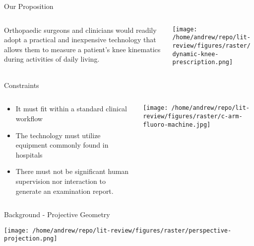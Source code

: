 \documentclass[presentation, aspectratio=1610]{beamer}
\begin{document}
\begin{frame}[label={sec:org0539fae}]{Our Proposition}
\begin{columns}
\begin{column}{0.5\columnwidth}
Orthopaedic surgeons and clinicians would readily adopt a \alert{\alert{practical}} and \alert{\alert{inexpensive}} technology that allows them to \alert{\alert{measure}} a patient's knee kinematics during \alert{\alert{activities of daily living}}.
\end{column}
\begin{column}{0.55\columnwidth}
\begin{center}
\texttt{[image: /home/andrew/repo/lit-review/figures/raster/dynamic-knee-prescription.png]}
\end{center}
\end{column}
\end{columns}
\end{frame}
\begin{frame}[label={sec:orgaeeee7c}]{Constraints}
\begin{columns}
\begin{column}{0.45\columnwidth}
\begin{itemize}
\item It must fit within a \alert{\alert{standard clinical workflow}}
\item The technology must utilize equipment \alert{\alert{commonly found in hospitals}}
\item There must not be significant \alert{\alert{human supervision}} nor interaction to generate an examination report.
\end{itemize}
\end{column}
\begin{column}{0.55\columnwidth}
\begin{center}
\texttt{[image: /home/andrew/repo/lit-review/figures/raster/c-arm-fluoro-machine.jpg]}
\end{center}
\end{column}
\end{columns}
\end{frame}
\begin{frame}[label={sec:org9dc2f4c}]{Background - Projective Geometry}
\begin{center}
\texttt{[image: /home/andrew/repo/lit-review/figures/raster/perspective-projection.png]}
\end{center}
\end{frame}
\end{document}
